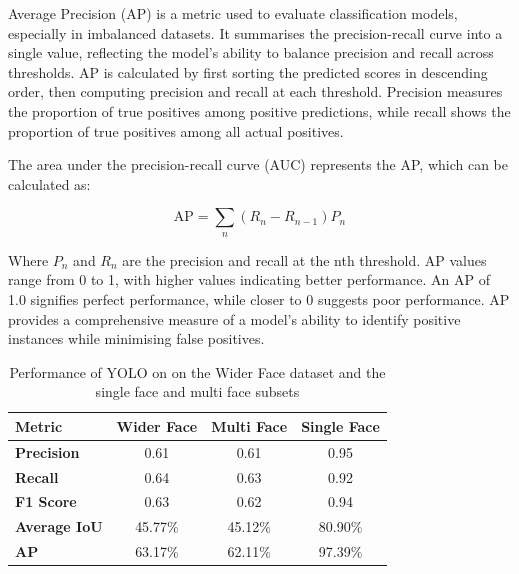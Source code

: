 Average Precision (AP) is a metric used to evaluate classification models, especially in imbalanced datasets. It summarises the precision-recall curve into a single value, reflecting the model's ability to balance precision and recall across thresholds. AP is calculated by first sorting the predicted scores in descending order, then computing precision and recall at each threshold. Precision measures the proportion of true positives among positive predictions, while recall shows the proportion of true positives among all actual positives.

The area under the precision-recall curve (AUC) represents the AP, which can be calculated as:

\[
\text{AP} = \sum_n (R_n - R_{n-1}) P_n
\]

Where \(P_{n}\) and \(R_{n}\) are the precision and recall at the nth threshold. AP values range from 0 to 1, with higher values indicating better performance. An AP of 1.0 signifies perfect performance, while closer to 0 suggests poor performance. AP provides a comprehensive measure of a model's ability to identify positive instances while minimising false positives.

\begin{table}[h!]
\centering{}
\caption{Performance of YOLO on on the Wider Face dataset and the single face and multi face subsets}
\begin{tabular}{|l|c|c|c|}
\hline
\textbf{Metric}      & \textbf{Wider Face} & \textbf{Multi Face}  & \textbf{Single Face} \\ \hline
\textbf{Precision}   & 0.61        & 0.61            & 0.95                 \\ \hline
\textbf{Recall}      & 0.64        & 0.63            & 0.92                 \\ \hline
\textbf{F1 Score}    & 0.63        & 0.62            & 0.94                 \\ \hline
\textbf{Average IoU} & 45.77\%     & 45.12\%            & 80.90\%              \\ \hline
\textbf{AP}          & 63.17\%     & 62.11\%              & 97.39\%              \\ \hline
\end{tabular}
\label{tab:YOLO}
\end{table}

